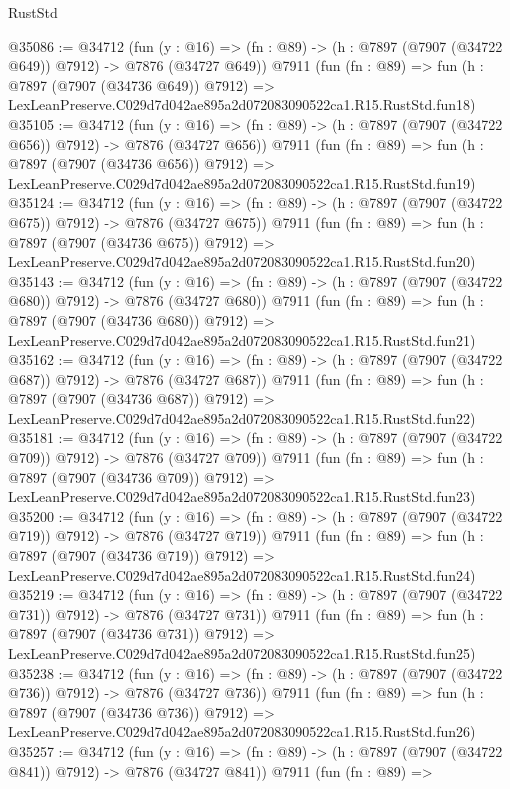 \begin{lexlean}{RustStd}
\begin{coremodule}
@35086 := @34712
    (fun (y : @16) => (fn : @89) -> (h : @7897 (@7907 (@34722 @649)) @7912) -> @7876 (@34727 @649))
    @7911
    (fun (fn : @89) =>
    fun (h : @7897 (@7907 (@34736 @649)) @7912) =>
    LexLeanPreserve.C029d7d042ae895a2d072083090522ca1.R15.RustStd.fun18)
@35105 := @34712
    (fun (y : @16) => (fn : @89) -> (h : @7897 (@7907 (@34722 @656)) @7912) -> @7876 (@34727 @656))
    @7911
    (fun (fn : @89) =>
    fun (h : @7897 (@7907 (@34736 @656)) @7912) =>
    LexLeanPreserve.C029d7d042ae895a2d072083090522ca1.R15.RustStd.fun19)
@35124 := @34712
    (fun (y : @16) => (fn : @89) -> (h : @7897 (@7907 (@34722 @675)) @7912) -> @7876 (@34727 @675))
    @7911
    (fun (fn : @89) =>
    fun (h : @7897 (@7907 (@34736 @675)) @7912) =>
    LexLeanPreserve.C029d7d042ae895a2d072083090522ca1.R15.RustStd.fun20)
@35143 := @34712
    (fun (y : @16) => (fn : @89) -> (h : @7897 (@7907 (@34722 @680)) @7912) -> @7876 (@34727 @680))
    @7911
    (fun (fn : @89) =>
    fun (h : @7897 (@7907 (@34736 @680)) @7912) =>
    LexLeanPreserve.C029d7d042ae895a2d072083090522ca1.R15.RustStd.fun21)
@35162 := @34712
    (fun (y : @16) => (fn : @89) -> (h : @7897 (@7907 (@34722 @687)) @7912) -> @7876 (@34727 @687))
    @7911
    (fun (fn : @89) =>
    fun (h : @7897 (@7907 (@34736 @687)) @7912) =>
    LexLeanPreserve.C029d7d042ae895a2d072083090522ca1.R15.RustStd.fun22)
@35181 := @34712
    (fun (y : @16) => (fn : @89) -> (h : @7897 (@7907 (@34722 @709)) @7912) -> @7876 (@34727 @709))
    @7911
    (fun (fn : @89) =>
    fun (h : @7897 (@7907 (@34736 @709)) @7912) =>
    LexLeanPreserve.C029d7d042ae895a2d072083090522ca1.R15.RustStd.fun23)
@35200 := @34712
    (fun (y : @16) => (fn : @89) -> (h : @7897 (@7907 (@34722 @719)) @7912) -> @7876 (@34727 @719))
    @7911
    (fun (fn : @89) =>
    fun (h : @7897 (@7907 (@34736 @719)) @7912) =>
    LexLeanPreserve.C029d7d042ae895a2d072083090522ca1.R15.RustStd.fun24)
@35219 := @34712
    (fun (y : @16) => (fn : @89) -> (h : @7897 (@7907 (@34722 @731)) @7912) -> @7876 (@34727 @731))
    @7911
    (fun (fn : @89) =>
    fun (h : @7897 (@7907 (@34736 @731)) @7912) =>
    LexLeanPreserve.C029d7d042ae895a2d072083090522ca1.R15.RustStd.fun25)
@35238 := @34712
    (fun (y : @16) => (fn : @89) -> (h : @7897 (@7907 (@34722 @736)) @7912) -> @7876 (@34727 @736))
    @7911
    (fun (fn : @89) =>
    fun (h : @7897 (@7907 (@34736 @736)) @7912) =>
    LexLeanPreserve.C029d7d042ae895a2d072083090522ca1.R15.RustStd.fun26)
@35257 := @34712
    (fun (y : @16) => (fn : @89) -> (h : @7897 (@7907 (@34722 @841)) @7912) -> @7876 (@34727 @841))
    @7911
    (fun (fn : @89) =>

\end{coremodule}
\end{lexlean}
